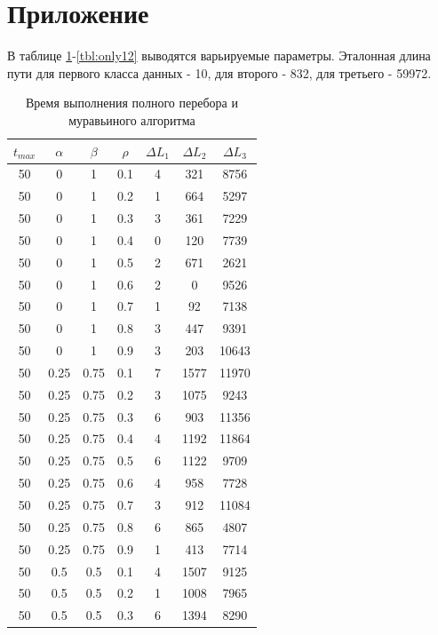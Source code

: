 \documentclass[12pt]{report}
\begin{document}
	\chapter*{Приложение}
	В таблице \ref{tbl:only1}-\ref{tbl:only12} выводятся варьируемые параметры. Эталонная длина пути для первого класса данных - 10, для второго - 832, для третьего - 59972.
	\begin{table}[H]
		\begin{center}
			\captionsetup{justification=raggedright, singlelinecheck=false}
			\caption[]{\label{tbl:only1} Время выполнения полного перебора и муравьиного алгоритма}
			\begin{tabular}{|c|c|c|c|c|c|c|}
				\hline
				$t_{max}$ & $\alpha$ & $\beta$ & $\rho$ & $\Delta L_{1}$ & $\Delta L_{2}$ & $\Delta L_{3}$ \\
				\hline
				50 & 0 & 1 & 0.1 & 4 & 321 & 8756 \\
				50 & 0 & 1 & 0.2 & 1 & 664 & 5297 \\
				50 & 0 & 1 & 0.3 & 3 & 361 & 7229 \\
				50 & 0 & 1 & 0.4 & 0 & 120 & 7739 \\
				50 & 0 & 1 & 0.5 & 2 & 671 & 2621 \\
				50 & 0 & 1 & 0.6 & 2 & 0 & 9526 \\
				50 & 0 & 1 & 0.7 & 1 & 92 & 7138 \\
				50 & 0 & 1 & 0.8 & 3 & 447 & 9391 \\
				50 & 0 & 1 & 0.9 & 3 & 203 & 10643 \\
				50 & 0.25 & 0.75 & 0.1 & 7 & 1577 & 11970 \\
				50 & 0.25 & 0.75 & 0.2 & 3 & 1075 & 9243 \\
				50 & 0.25 & 0.75 & 0.3 & 6 & 903 & 11356 \\
				50 & 0.25 & 0.75 & 0.4 & 4 & 1192 & 11864 \\
				50 & 0.25 & 0.75 & 0.5 & 6 & 1122 & 9709 \\
				50 & 0.25 & 0.75 & 0.6 & 4 & 958 & 7728 \\
				50 & 0.25 & 0.75 & 0.7 & 3 & 912 & 11084 \\
				50 & 0.25 & 0.75 & 0.8 & 6 & 865 & 4807 \\
				50 & 0.25 & 0.75 & 0.9 & 1 & 413 & 7714 \\
				50 & 0.5 & 0.5 & 0.1 & 4 & 1507 & 9125 \\
				50 & 0.5 & 0.5 & 0.2 & 1 & 1008 & 7965 \\
				50 & 0.5 & 0.5 & 0.3 & 6 & 1394 & 8290 \\

\end{tabular}
\end{center}
\end{table}
\end{document}
